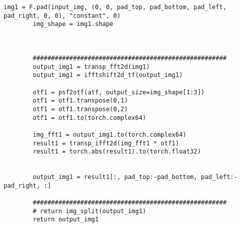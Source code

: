\begin{lstlisting}[style=Python]
        img1 = F.pad(input_img, (0, 0, pad_top, pad_bottom, pad_left, pad_right, 0, 0), "constant", 0)
        img_shape = img1.shape



        #####################################################
        output_img1 = transp_fft2d(img1)
        output_img1 = ifftshift2d_tf(output_img1)

        otf1 = psf2otf(atf, output_size=img_shape[1:3])
        otf1 = otf1.transpose(0,1)
        otf1 = otf1.transpose(0,2)
        otf1 = otf1.to(torch.complex64)

        img_fft1 = output_img1.to(torch.complex64)
        result1 = transp_ifft2d(img_fft1 * otf1)
        result1 = torch.abs(result1).to(torch.float32) 


        output_img1 = result1[:, pad_top:-pad_bottom, pad_left:-pad_right, :]

        #####################################################
        # return img_split(output_img1)
        return output_img1
\end{lstlisting}